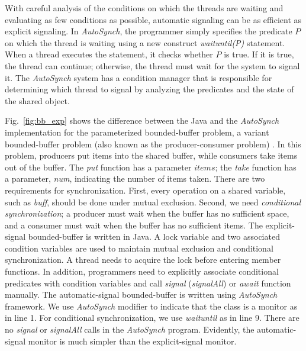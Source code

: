 \documentclass[preprint]{sigplanconf}
\begin{document}
 With careful analysis of the conditions on which
the threads are waiting and evaluating as few conditions as possible, automatic signaling can be as efficient 
as explicit signaling.
In {\em AutoSynch}, the programmer simply specifies the predicate $P$ on which the thread is 
waiting using a new construct {\em waituntil(P)} statement. 
When a thread executes the statement, it checks whether $P$ is true. If it is true, the thread can continue; 
otherwise, the thread must wait for the system to signal it. The {\em
AutoSynch} system has a condition manager that is responsible for determining
which thread to signal by analyzing the predicates and the state of the shared object. 


Fig.~\ref{fig:bb_exp} shows the difference between 
the Java and the {\em AutoSynch} implementation for the parameterized bounded-buffer
problem, a variant bounded-buffer problem (also known as the producer-consumer problem) \cite{dijk65, dijk71}. 
In this problem, producers put items into the shared buffer, while 
consumers take items out of the buffer. The {\em put} function has a parameter
$items$; the {\em take} function has a parameter, {\em num}, 
indicating the number of items taken. There are two requirements for synchronization.
First, every operation on a shared variable, such as {\em buff}, should be done 
under mutual exclusion. Second, we need {\em conditional synchronization};
a producer must wait when the buffer has no sufficient space, and a consumer 
must wait when the buffer has no sufficient items. The explicit-signal 
bounded-buffer is written in Java. A lock variable and two associated condition 
variables are used to maintain mutual exclusion and conditional 
synchronization. A thread needs to acquire the lock before entering member
functions. In addition, programmers need to explicitly associate conditional 
predicates with condition variables and call {\em signal} ({\em signalAll}) or
{\em await} 
function manually.
The automatic-signal bounded-buffer is written using {\em AutoSynch} framework.
We use {\em AutoSynch} modifier to indicate that the class is a monitor as in line 
1. For conditional synchronization,  we use {\em waituntil} as in line 9. There are 
no {\em signal} or {\em signalAll} calls in the {\em AutoSynch} program.
Evidently, the automatic-signal monitor is
much simpler than the explicit-signal monitor. 
\end{document}

